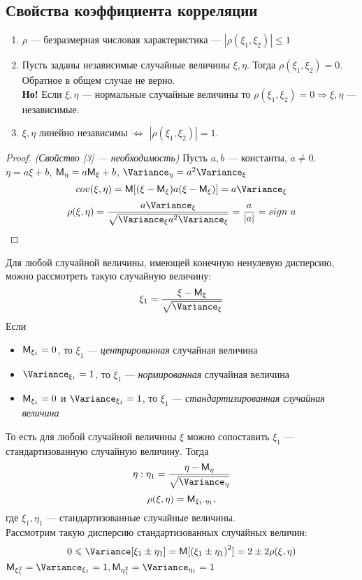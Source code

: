 \subsection{Свойства коэффициента корреляции}
\begin{enumerate}
  \item $\rho$ --- безразмерная числовая характеристика --- $| \rho(\xi_1, \xi_2) | \leqslant 1$
  \item Пусть заданы независимые случайные величины $\xi, \eta$. Тогда $\rho(\xi_1, \xi_2) = 0$. Обратное в общем случае не верно. \\
  \textbf{Но!} Если $\xi, \eta$ --- нормальные случайные величины то $\rho(\xi_1, \xi_2) = 0 \Rightarrow \xi, \eta$ --- независимые.
  \item $\xi, \eta$ линейно независимы $\Leftrightarrow$ $| \rho(\xi_1, \xi_2) | = 1$.
  \end{enumerate}
  \begin{proof} \textit{(Свойство [3] --- необходимость)}
    Пусть $a, b$ --- константы, $a \neq 0$.\\
    $\eta = a\xi + b$, $\mathsf{M}_{\eta} = a \mathsf{M}_{\xi} + b$, $\Variance_{\eta} = a^2 \Variance_{\xi}$
    \[
      cov(\xi, \eta) = \MExpect [(\xi - \MExpect_{\xi})a(\xi - \MExpect_{\xi})] = a \Variance_{\xi}
    \]
    \[
      \rho (\xi, \eta) = \frac{a \Variance_{\xi}}{\sqrt{\Variance_{\xi} a^2 \Variance_{\xi}}} = \frac{a}{|a|} = sign \ a
    \]
  \end{proof}
  \begin{interjection}
    Для любой случайной величины, имеющей конечную ненулевую дисперсию, можно рассмотреть такую случайную величину:
    \[
      \xi_1 = \frac{\xi - \MExpect_{\xi}}{\sqrt{\Variance_{\xi}}}
    \]
    Если
    \begin{itemize}
      \item $\mathsf{M}_{\xi_1} = 0$, то $\xi_1$ --- \textit{центрированная} случайная величина
      \item $\Variance_{\xi_1} = 1$, то $\xi_1$ --- \textit{нормированная} случайная величина
      \item $\mathsf{M}_{\xi_1} = 0$ и $\Variance_{\xi_1} = 1$, то $\xi_1$ --- \textit{стандартизированная случайная величина}
    \end{itemize}
    То есть для любой случайной величины $\xi$ можно сопоставить $\xi_1$ --- стандартизованную случайную величину. Тогда
    \[
      \eta : \eta_1 = \frac{\eta - \MExpect_{\eta}}{\sqrt{\Variance_{\eta}}}
    \]
    \[
      \rho (\xi, \eta) = \mathsf{M}_{\xi_1 \cdot \eta_1},
    \]
    где $\xi_1, \eta_1$ --- стандартизованные случайные величины. \\
    Рассмотрим такую дисперсию стандартизованных случайных величин:
    \[
      0 \leqslant \Variance [\xi_1 \pm \eta_1] = \MExpect [{(\xi_1 \pm \eta_1)}^2] = 2 \pm 2 \rho(\xi, \eta)
    \]
    $\MExpect_{\xi_1^2} = \Variance_{\xi_1} = 1, \MExpect_{\eta_1^2} = \Variance_{\eta_1} = 1$
  \end{interjection}
